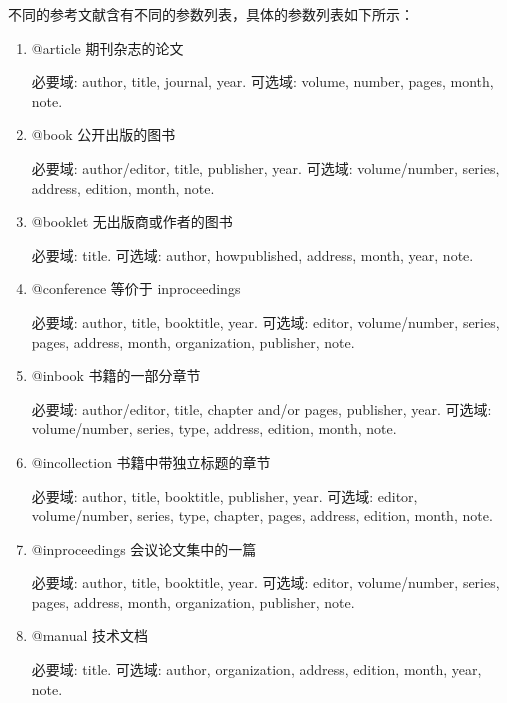 \documentclass{bjfu}
\begin{document}
不同的参考文献含有不同的参数列表，具体的参数列表如下所示：
\begin{enumerate}[labelsep = .5em, leftmargin = 0pt, itemindent = 3em]
    \item  @article
    期刊杂志的论文
    
    \setlength{\parindent}{2em}必要域: author, title, journal, year.
    可选域: volume, number, pages, month, note.
    
    \item @book
    公开出版的图书
    
    \setlength{\parindent}{2em}必要域: author/editor, title, publisher, year.
    可选域: volume/number, series, address, edition, month, note.
    
    \item @booklet
    无出版商或作者的图书
    
    \setlength{\parindent}{2em}必要域: title.
    可选域: author, howpublished, address, month, year, note.
    
    \item @conference
    等价于 inproceedings
    
    \setlength{\parindent}{2em}必要域: author, title, booktitle, year.
    可选域: editor, volume/number, series, pages, address, month, organization, publisher, note.
    
    \item @inbook
    书籍的一部分章节
    
    \setlength{\parindent}{2em}必要域: author/editor, title, chapter and/or pages, publisher, year.
    可选域: volume/number, series, type, address, edition, month, note.
    
    \item @incollection
    书籍中带独立标题的章节
    
    \setlength{\parindent}{2em}必要域: author, title, booktitle, publisher, year.
    可选域: editor, volume/number, series, type, chapter, pages, address, edition, month, note.
    
    \item @inproceedings
    会议论文集中的一篇
    
    \setlength{\parindent}{2em}必要域: author, title, booktitle, year.
    可选域: editor, volume/number, series, pages, address, month, organization, publisher, note.
    
    \item @manual
    技术文档
    
    \setlength{\parindent}{2em}必要域: title.
    可选域: author, organization, address, edition, month, year, note.
    

\end{enumerate}
\end{document}
